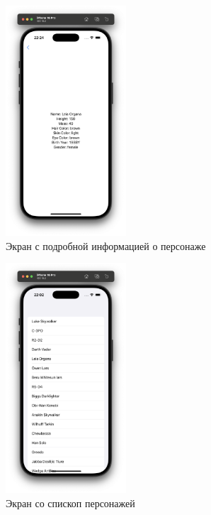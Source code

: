 \documentclass[14pt, russian]{scrartcl}
\begin{document}
\begin{figure}[H]
    \centering
    \includegraphics[width=0.4\textwidth]{ios_details.png}
    \caption{Экран с подробной информацией о персонаже}
    \label{fig:details_screen}
\end{figure}

\begin{figure}[H]
    \centering
    \includegraphics[width=0.4\textwidth]{ios_list.png}
    \caption{Экран со спископ персонажей}
    \label{fig:list_screen}
\end{figure}
\end{document}
